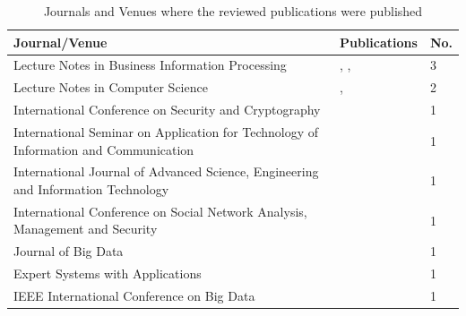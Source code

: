 \documentclass[runningheads]{llncs}
\begin{document}
\begin{table}
    \centering
    \caption{Journals and Venues where the reviewed publications were published}
    \label{sources}
    \begin{tabular}{ | m{9cm} | l | l |}
        \hline
        \textbf{Journal/Venue}                                                               & \textbf{Publications}                                                     & \textbf{No.} \\
        \hline
        \hline
        Lecture Notes in Business Information Processing                                     & \cite{Breitmayer202411}, \cite{MozafariMehr202182}, \cite{Leitner2013719} & 3            \\
        \hline
        Lecture Notes in Computer Science                                                    & \cite{MozafariMehr2022397}, \cite{Zahoransky2014360}                      & 2            \\
        \hline
        International Conference on Security and Cryptography                                & \cite{Dedousis202235}                                                     & 1            \\
        \hline
        International Seminar on Application for Technology of Information and Communication & \cite{Silalahi20221}                                                      & 1            \\
        \hline
        International Journal of Advanced Science, Engineering and Information Technology    & \cite{Yunizal20221387}                                                    & 1            \\
        \hline
        International Conference on Social Network Analysis, Management and Security         & \cite{MacAk2020}                                                          & 1            \\
        \hline
        Journal of Big Data                                                                  & \cite{Sarno2020}                                                          & 1            \\
        \hline
        Expert Systems with Applications                                                     & \cite{Fazzinga2020}                                                       & 1            \\
        \hline
        IEEE International Conference on Big Data                                            & \cite{Zaman20192982}                                                      & 1            \\

\end{tabular}
\end{table}
\end{document}
